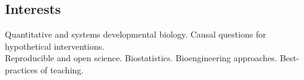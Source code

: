 \documentclass[margin,line]{res}
\begin{document}
\begin{resume}

\vspace*{.15in}

\section{\sc Interests}%

Quantitative and systems developmental biology. Causal questions for hypothetical interventions.\\
Reproducible and open science. Biostatistics. Bioengineering approaches. Best-practices of teaching.



\end{resume}
\end{document}

